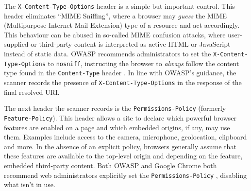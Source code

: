 \documentclass[pdflatex,sn-mathphys-num]{sn-jnl}
\numberwithin{equation}{section}
\theoremstyle{thmstyleone}
\theoremstyle{thmstyletwo}%
\theoremstyle{thmstylethree}%
\begin{document}
\vspace{1em}The \texttt{X-Content-Type-Options} header is a simple but important control. This header eliminates 
``MIME Sniffing'', where a browser may \emph{guess} the MIME (Multipurpose Internet Mail Extension) type of a 
resource and act accordingly. This behaviour can be abused in so-called MIME confusion
attacks, where user-supplied or third-party content is interpreted as active HTML or JavaScript instead of 
static data. OWASP recommends administrators to set the \texttt{X-Content-Type-Options} to \texttt{nosniff}, instructing
the browser to \emph{always} follow the content type found in the \texttt{Content-Type} header
\cite{owasp_http_security_response_headers, mdn_mime_types_guide}. In line with OWASP's guidance, the scanner records
the presence of \texttt{X-Content-Type-Options} in the response of the final resolved URI.


\vspace{1em}The next header the scanner records is the \texttt{Permissions-Policy} (formerly \texttt{Feature-Policy}). This header allows a site
to declare which powerful browser features are enabled on a page and which embedded origins, if any, may use them. Examples include 
access to the camera, microphone, geolocation, clipboard and more. 
In the absence of an explicit policy, browsers generally assume that these features are available to the top-level origin and depending on the feature, 
embedded third-party content. Both OWASP and Google Chrome both recommend web administrators explicitly set the \texttt{Permissions-Policy} 
\cite{owasp_http_security_response_headers, chrome_permissions_policy}, 
disabling what isn't in use. 

\end{document}
